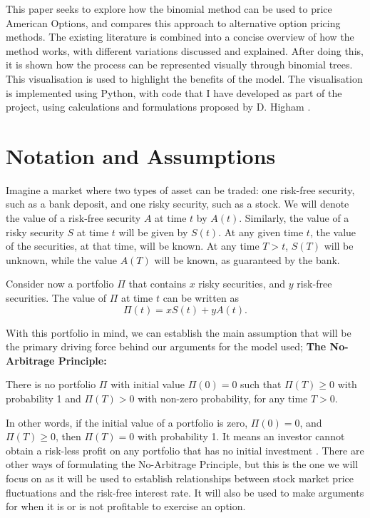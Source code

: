 \documentclass[letterpaper,12pt]{article}
\theoremstyle{plain}
\numberwithin{equation}{section}
\begin{document}
This paper seeks to explore how the binomial method can be used to price American Options, and compares this approach to alternative option pricing methods. The existing literature is combined into a concise overview of how the method works, with different variations discussed and explained. After doing this, it is shown how the process can be represented visually through binomial trees. This visualisation is used to highlight the benefits of the model. The visualisation is implemented using Python, with code that I have developed as part of the project, using calculations and formulations proposed by D. Higham \cite{FOV}.\\

\section{Notation and Assumptions}

Imagine a market where two types of asset can be traded: one risk-free security, such as a bank deposit, and one risky security, such as a stock. We will denote the value of a risk-free security $A$ at time $t$ by $A(t)$. Similarly, the value of a risky security $S$ at time $t$ will be given by $S(t)$. At any given time $t$, the value of the securities, at that time, will be known. At any time $T>t$, $S(T)$ will be unknown, while the value $A(T)$ will be known, as guaranteed by the bank.

Consider now a portfolio $\Pi$ that contains $x$ risky securities, and $y$ risk-free securities. The value of $\Pi$ at time $t$ can be written as
\begin{equation}
	\Pi(t) = xS(t) + yA(t).
\end{equation}

With this portfolio in mind, we can establish the main assumption that will be the primary driving force behind our arguments for the model used; \textbf{The No-Arbitrage Principle:} 
\begin{assumption}
There is no portfolio $\Pi$ with initial value $\Pi(0) = 0$ such that $\Pi(T) \geq 0$ with probability 1 and $\Pi(T) > 0$ with non-zero probability, for any time $T>0$.
\end{assumption}

In other words, if the initial value of a portfolio is zero, $\Pi(0) = 0$, and $\Pi(T) \geq 0$, then $\Pi(T) = 0$ with probability 1. It means an investor cannot obtain a risk-less profit on any portfolio that has no initial investment \cite{MFF}. There are other ways of formulating the No-Arbitrage Principle, but this is the one we will focus on as it will be used to establish relationships between stock market price fluctuations and the risk-free interest rate. It will also be used to make arguments for when it is or is not profitable to exercise an option. 
\end{document}
